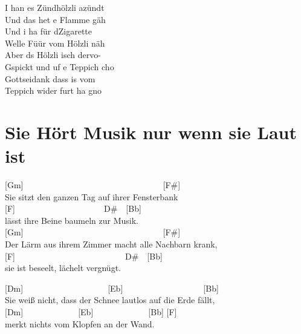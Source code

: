 \documentclass[
  letterpaper,
  a5paper]{memoir}
\begin{document}
I han es Zündhölzli azündt\\
Und das het e Flamme gäh\\
Und i ha für d\textquotesingle Zigarette\\
Welle Füür vom Hölzli näh\\
Aber ds Hölzli isch dervo-\\
Gspickt und uf e Teppich cho\\
Gottseidank dass i\textquotesingle s vom\\
Teppich wider furt ha gno

\hypertarget{sie-huxf6rt-musik-nur-wenn-sie-laut-ist}{%
\chapter{Sie Hört Musik nur wenn sie Laut
ist}\label{sie-huxf6rt-musik-nur-wenn-sie-laut-ist}}

{[}Gm{]}~~~~~~~~~~~~~~~~~~~~~~~~~~~~~~~~~{[}F\#{]}\\
Sie sitzt den ganzen Tag auf ihrer Fensterbank\\
{[}F{]}~~~~~~~~~~~~~~~~~~~~~D\#~~{[}Bb{]}\\
lässt ihre Beine baumeln zur Musik.\\
{[}Gm{]}~~~~~~~~~~~~~~~~~~~~~~~~~~~~~~~~~{[}F\#{]}\\
Der Lärm aus ihrem Zimmer macht alle Nachbarn krank,\\
{[}F{]}~~~~~~~~~~~~~~~~~~~~~~~~~~D\#~~{[}Bb{]}\\
sie ist beseelt, lächelt vergnügt.

{[}Dm{]}~~~~~~~~~~~~~~~~~~~~{[}Eb{]}~~~~~~~~~~~~~~~~~~~{[}Bb{]}\\
Sie weiß nicht, dass der Schnee lautlos auf die Erde fällt,\\
{[}Dm{]}~~~~~~~~~~~~~{[}Eb{]}~~~~~~~~~~~~~{[}Bb{]} {[}F{]}\\
merkt nichts vom Klopfen an der Wand.
\end{document}
